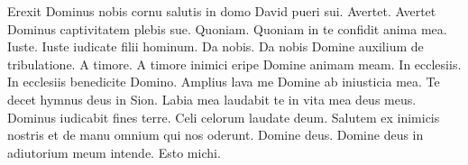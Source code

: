 \begin{multicols*}{2}
 Erexit Dominus nobis cornu salutis in domo David pueri sui.
 Avertet.
 Avertet Dominus captivitatem plebis sue.
 Quoniam.
 Quoniam in te confidit anima mea.
 Iuste.
 Iuste iudicate filii hominum.
 Da nobis.
 Da nobis Domine auxilium de tribulatione.
 A timore.
 A timore inimici eripe Domine animam meam.
 In ecclesiis.
 In ecclesiis benedicite Domino.
 Amplius lava me Domine ab iniusticia mea.
 Te decet hymnus deus in Sion.
 Labia mea laudabit te in vita mea deus meus.
 Dominus iudicabit fines terre.
 Celi celorum laudate deum.
 Salutem ex inimicis nostris et de manu omnium qui nos oderunt.
 Domine deus.
 Domine deus in adiutorium meum intende.
 Esto michi.

\end{multicols*}
